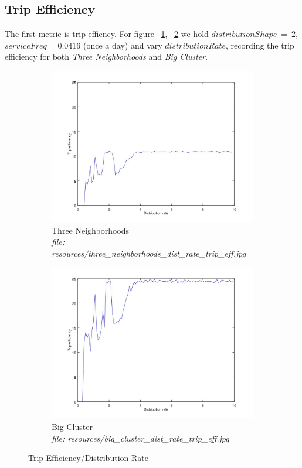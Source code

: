 \documentclass{article}
\begin{document}
		\subsection{Trip Efficiency}
		The first metric is trip effiency. For figure ~\ref{fig:fig7a}, ~\ref{fig:fig7b} we hold $distributionShape\ =\ 2$, $serviceFreq = 0.0416$ (once a day) and vary $distributionRate$, recording
		the trip efficiency for both \textit{Three Neighborhoods} and \textit{Big Cluster}.
		

		\begin{figure}[H]
			\centering
			\begin{subfigure}[b]{.5\textwidth}
				\includegraphics[width=\textwidth]{resources/three_neighborhoods_dist_rate_trip_eff.jpg}
				\caption{Three Neighborhoods \\\textit{file: resources/three\_neighborhoods\_dist\_rate\_trip\_eff.jpg}}
				\label{fig:fig7a}
			\end{subfigure}\hfill%
			\begin{subfigure}[b]{.5\textwidth}
				\includegraphics[width=\textwidth]{resources/big_cluster_dist_rate_trip_eff.jpg}
				\caption{Big Cluster\\\textit{file: resources/big\_cluster\_dist\_rate\_trip\_eff.jpg}}
				\label{fig:fig7b}
			\end{subfigure}
			\label{fig:fig7}
			\caption{Trip Efficiency/Distribution Rate}
		\end{figure}
\end{document}
